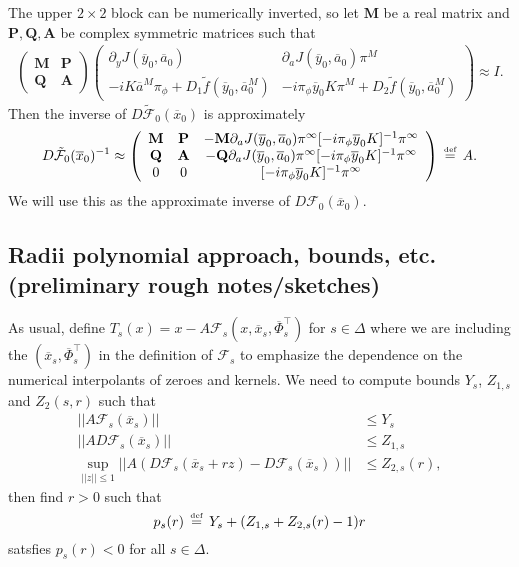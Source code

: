 \documentclass[10pt]{article}
\newcommand{\m}[1]{\mathbf{#1}}
\newcommand{\bydef}{\,\stackrel{\mbox{\tiny\textnormal{\raisebox{0ex}[0ex][0ex]{def}}}}{=}\,}
\begin{document}
The upper $2\times 2$ block can be numerically inverted, so let $\mathbf{M}$ be a real matrix and $\mathbf{P},\m{Q},\m{A}$ be complex symmetric matrices such that 
\begin{align*}
\left(\begin{array}{cc}\m{M}&\m{P}\\\m{Q}&\m{A}\end{array}\right)\left(\begin{array}{cc}\partial_y J(\overline y_0,\overline a_0) & \partial_a J(\overline y_0,\overline a_0)\pi^M \\ -iK\overline a^M\pi_\phi + D_1\tilde f(\overline y_0,\overline a_0^M) & -i\pi_\phi\overline y_0 K\pi^M + D_2\tilde f(\overline y_0,\overline a_0^M) \end{array}\right)\approx I.
\end{align*}
Then the inverse of $D\tilde{\mathcal{F}}_0(\overline x_0)$ is approximately
\begin{align*}
D\tilde{\mathcal{F}}_0(\overline x_0)^{-1}\approx \left(\begin{array}{ccc}
\m{M}&\m{P}&-\m{M}\partial_a J(\overline y_0,\overline a_0)\pi^\infty[-i\pi_\phi \overline y_0 K]^{-1}\pi^\infty\\
\m{Q}&\m{A}&-\m{Q}\partial_aJ(\overline y_0,\overline a_0)\pi^\infty[-i\pi_\phi \overline y_0 K]^{-1}\pi^\infty\\
0&0& [-i\pi_\phi \overline y_0 K]^{-1}\pi^\infty\end{array}\right)\bydef A.
\end{align*}
We will use this as the approximate inverse of $D\mathcal{F}_0(\overline x_0)$.

\subsection{Radii polynomial approach, bounds, etc. (preliminary rough notes/sketches)}
As usual, define $T_s(x) = x - A\mathcal{F}_s(x,\overline x_s,\overline\Phi_s^\intercal)$ for $s\in\Delta$  where we are including the $(\overline x_s,\overline\Phi_s^\intercal)$ in the definition of $\mathcal{F}_s$ to emphasize the dependence on the numerical interpolants of zeroes and kernels. We need to compute bounds $Y_s$, $Z_{1,s}$ and $Z_2(s,r)$ such that
\begin{align*}
||A\mathcal{F}_s(\overline x_s)||&\leq Y_s\\
||AD\mathcal{F}_s(\overline x_s)||&\leq Z_{1,s}\\
\sup_{||z||\leq 1}||A(D\mathcal{F}_s(\overline x_s+rz)-D\mathcal{F}_s(\overline x_s))||&\leq Z_{2,s}(r),
\end{align*}
then find $r>0$ such that
$$p_s(r)\bydef Y_s + (Z_{1,s}+Z_{2,s}(r)-1)r$$
satsfies $p_s(r)<0$ for all $s\in\Delta$.
\end{document}
